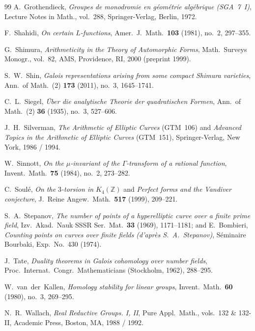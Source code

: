 \begin{thebibliography}{99}
A.~Grothendieck,
\emph{Groupes de monodromie en g\'eom\'etrie alg\'ebrique (SGA~7~I)},
Lecture Notes in Math., vol.~288, Springer-Verlag, Berlin, 1972.

F.~Shahidi,
\emph{On certain $L$-functions},
Amer.\ J.\ Math.\ \textbf{103} (1981), no.~2, 297--355.

G.~Shimura,
\emph{Arithmeticity in the Theory of Automorphic Forms},
Math.\ Surveys Monogr., vol.~82, AMS, Providence, RI, 2000 (preprint 1999).

S.~W.~Shin,
\emph{Galois representations arising from some compact Shimura varieties},
Ann.\ of Math.\ (2) \textbf{173} (2011), no.~3, 1645--1741.

C.~L.~Siegel,
\emph{\"Uber die analytische Theorie der quadratischen Formen},
Ann.\ of Math.\ (2) \textbf{36} (1935), no.~3, 527--606.

J.~H.~Silverman,
\emph{The Arithmetic of Elliptic Curves} (GTM~106) and \emph{Advanced Topics in the Arithmetic of Elliptic Curves} (GTM~151),
Springer-Verlag, New York, 1986 / 1994.

W.~Sinnott,
\emph{On the $\mu$-invariant of the $\Gamma$-transform of a rational function},
Invent.\ Math.\ \textbf{75} (1984), no.~2, 273--282.

C.~Soul\'e,
\emph{On the $3$-torsion in $K_4(\mathbb{Z})$} and \emph{Perfect forms and the Vandiver conjecture},
J.\ Reine Angew.\ Math.\ \textbf{517} (1999), 209--221.

S.~A.~Stepanov,
\emph{The number of points of a hyperelliptic curve over a finite prime field},
Izv.\ Akad.\ Nauk SSSR Ser.\ Mat.\ \textbf{33} (1969), 1171--1181; and E.~Bombieri, \emph{Counting points on curves over finite fields (d'apr\`es S.~A.~Stepanov)}, S\'eminaire Bourbaki, Exp.\ No.~430 (1974).

J.~Tate,
\emph{Duality theorems in Galois cohomology over number fields},
Proc.\ Internat.\ Congr.\ Mathematicians (Stockholm, 1962), 288--295.

W.~van~der~Kallen,
\emph{Homology stability for linear groups},
Invent.\ Math.\ \textbf{60} (1980), no.~3, 269--295.

N.~R.~Wallach,
\emph{Real Reductive Groups. I, II},
Pure Appl.\ Math., vols.~132 \& 132-II, Academic Press, Boston, MA, 1988 / 1992.


\end{thebibliography}
